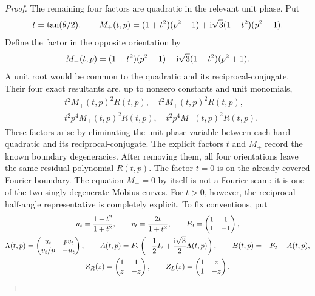 \begin{proof}
The remaining four factors are quadratic in the relevant unit phase.  Put
\begin{equation}
t=\tan(\theta/2),\qquad
M_+(t,p)=(1+t^2)(p^2-1)
 +\mathrm i\sqrt3(1-t^2)(p^2+1).
\label{eq:supp-karlsson-Mplus}
\end{equation}
Define the factor in the opposite orientation by
\begin{equation}
M_-(t,p)=(1+t^2)(p^2-1)
 -\mathrm i\sqrt3(1-t^2)(p^2+1).
\label{eq:supp-karlsson-Mminus}
\end{equation}
A unit root would be common to the quadratic and its reciprocal-conjugate.  Their four exact resultants are, up to nonzero constants and unit monomials,
\begin{equation}
\begin{split}
&t^2M_+(t,p)^2R(t,p),\quad t^2M_+(t,p)^2R(t,p),\\
&t^2p^4M_+(t,p)^2R(t,p),\quad
t^2p^4M_+(t,p)^2R(t,p).
\end{split}
\label{eq:supp-karlsson-resultants}
\end{equation}
These factors arise by eliminating the unit-phase variable between each hard quadratic and its reciprocal-conjugate. The explicit factors $t$ and $M_+$ record the known boundary degeneracies. After removing them, all four orientations leave the same residual polynomial $R(t,p)$. The factor $t=0$ is on the already covered Fourier boundary.  The equation $M_+=0$ by itself is not a Fourier seam: it is one of the two singly degenerate M\"obius curves.  For $t>0$, however, the reciprocal half-angle representative is completely explicit.  To fix conventions, put
\begin{equation}
\begin{gathered}
 u_t=\frac{1-t^2}{1+t^2},\qquad v_t=\frac{2t}{1+t^2},\qquad
 F_2=\begin{pmatrix}1&1\\1&-1\end{pmatrix},\\
 \Lambda(t,p)=\begin{pmatrix}u_t&pv_t\\v_t/p&-u_t\end{pmatrix},\qquad
 A(t,p)=F_2\left(-\frac12I_2+\frac{\I\sqrt3}{2}\Lambda(t,p)\right),
 \qquad B(t,p)=-F_2-A(t,p),\\
 Z_R(z)=\begin{pmatrix}1&1\\z&-z\end{pmatrix},\qquad
 Z_L(z)=\begin{pmatrix}1&z\\1&-z\end{pmatrix}.

\end{gathered}
\end{equation}
\end{proof}
